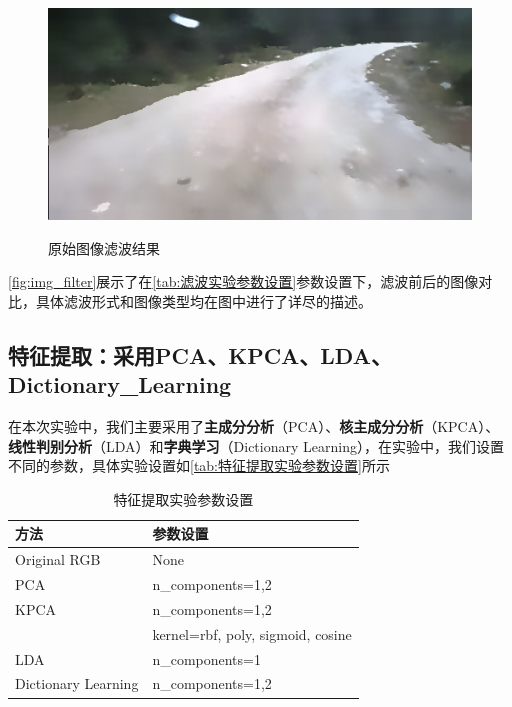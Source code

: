 \documentclass[12pt,hyperref,a4paper,UTF8]{ctexart}
\begin{document}
\begin{figure}[htbp]
{	\includegraphics[width=0.3\linewidth]{../output/1_image_processing/mean_shift_filter_0618.png}
}
\caption{原始图像滤波结果}
\label{fig:img_filter}
\end{figure}

\par

\autoref{fig:img_filter}展示了在\autoref{tab:滤波实验参数设置}参数设置下，滤波前后的图像对比，具体滤波形式和图像类型均在图中进行了详尽的描述。


\subsection{特征提取：采用PCA、KPCA、LDA、Dictionary\_Learning}
在本次实验中，我们主要采用了\textbf{主成分分析}（PCA）、\textbf{核主成分分析}（KPCA）、\textbf{线性判别分析}（LDA）和\textbf{字典学习}（Dictionary Learning），在实验中，我们设置不同的参数，具体实验设置如\autoref{tab:特征提取实验参数设置}所示

\begin{table}[!htbp]

\caption{特征提取实验参数设置}
    \centering
    \begin{tabular}{ll}
    \hline
        \textbf{方法} & \textbf{参数设置} \\
        \hline
        Original RGB & None \\
        
        PCA  & n\_components=1,2 \\
        
        KPCA & n\_components=1,2 \\
          & kernel=rbf, poly, sigmoid, cosine \\
          
        LDA  & n\_components=1 \\
        
        Dictionary Learning  & n\_components=1,2 \\
        \hline
    \end{tabular}
    \label{tab:特征提取实验参数设置}
\end{table}
\end{document}
